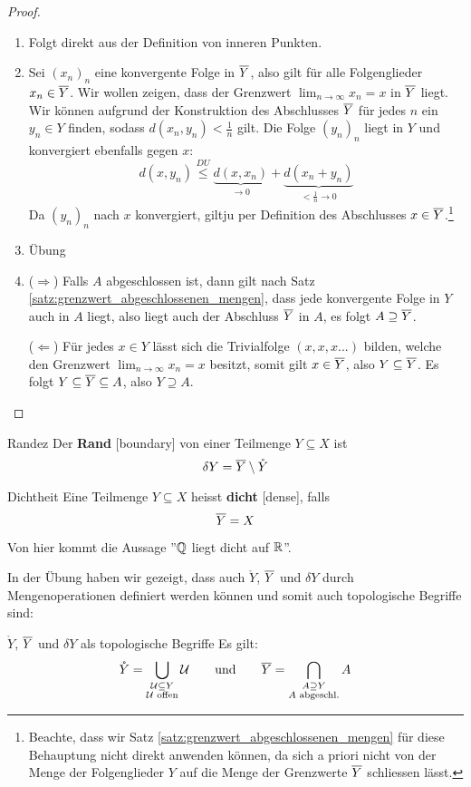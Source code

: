 \begin{proof}
\begin{enumerate}[label=\alph*)]
    \item Folgt direkt aus der Definition von inneren Punkten.
    \item Sei $(x_n)_n$ eine konvergente Folge in $\overline{Y}$, also gilt für alle Folgenglieder $x_n \in \overline{Y}$. Wir wollen zeigen, dass der Grenzwert $\lim_{n \to \infty}x_n = x$ in $\overline{Y}$ liegt. Wir können aufgrund der Konstruktion des Abschlusses $\overline{Y}$ für jedes $n$ ein $y_n \in Y$ finden, sodass $d(x_n, y_n) < \frac{1}{n}$ gilt. Die Folge $(y_n)_n$ liegt in $Y$ und konvergiert ebenfalls gegen $x$:
    $$d(x,y_n) \stackrel{DU}{\leq} \underbrace{d(x,x_n)}_{\to 0} + \underbrace{d(x_n + y_n)}_{<\frac{1}{n} \to 0}$$
    Da $(y_n)_n$ nach $x$ konvergiert, giltju per Definition des Abschlusses $x \in \overline{Y}$.\footnote{Beachte, dass wir Satz \ref{satz:grenzwert_abgeschlossenen_mengen} für diese Behauptung nicht direkt anwenden können, da sich a priori nicht von der Menge der Folgenglieder $Y$ auf die Menge der Grenzwerte $\overline{Y}$ schliessen lässt.}
    \item Übung 
    \item ($\Longrightarrow$) Falls $A$ abgeschlossen ist, dann gilt nach Satz \ref{satz:grenzwert_abgeschlossenen_mengen}, dass jede konvergente Folge in $Y$ auch in $A$ liegt, also liegt auch der Abschluss $\overline{Y}$ in $A$, es folgt $A \supseteq \overline{Y}$.
    
    ($\Longleftarrow$) Für jedes $x \in Y$ lässt sich die Trivialfolge $(x,x,x...)$ bilden, welche den Grenzwert $\lim_{n \to \infty} x_n = x$ besitzt, somit gilt $x \in \overline{Y}$, also $Y \subseteq \overline{Y}$. Es folgt $Y \subseteq \overline{Y} \subseteq A$, also $Y \supseteq A$.
\end{enumerate}
\end{proof}
\begin{definition}{Rand}{}ez
Der \textbf{Rand} [boundary] von einer Teilmenge $Y \subseteq X$ ist
$$\delta Y = \overline{Y} \setminus \mathring{Y}$$
\end{definition}
\begin{definition}{Dichtheit}{}
Eine Teilmenge $Y \subseteq X$ heisst \textbf{dicht} [dense], falls
$$\overline{Y} = X$$
\end{definition}
\begin{remark}
Von hier kommt die Aussage ''$\mathbb{Q}$ liegt dicht auf $\mathbb{R}$''.
\end{remark}
In der Übung haben wir gezeigt, dass auch $\mathring{Y}$, $\overline{Y}$ und $\delta Y$ durch Mengenoperationen definiert werden können und somit auch topologische Begriffe sind:
\begin{korollar}{$\mathring{Y}$, $\overline{Y}$ und $\delta Y$ als topologische Begriffe}{}
Es gilt:
$$\mathring{Y} = \bigcup_{\substack{\mathcal{U}\subseteq Y \\ \mathcal{U} \text{ offen}}} \mathcal{U} \qquad \text{und} \qquad  \overline{Y} = \bigcap_{\substack{A\supseteq Y \\ A \text{ abgeschl.}}} A$$
\end{korollar}

